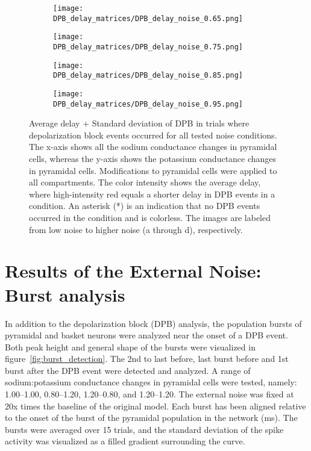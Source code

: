 \begin{figure}[htbp]
    \centering
    \begin{subfigure}{0.48\textwidth}
        \texttt{[image: DPB\_delay\_matrices/DPB\_delay\_noise\_0.65.png]}
        \caption{} %
    \end{subfigure}\hfill
    \begin{subfigure}{0.48\textwidth}
        \texttt{[image: DPB\_delay\_matrices/DPB\_delay\_noise\_0.75.png]}
        \caption{} %
    \end{subfigure}

    \bigskip %

    \begin{subfigure}{0.48\textwidth}
        \texttt{[image: DPB\_delay\_matrices/DPB\_delay\_noise\_0.85.png]}
        \caption{} %
    \end{subfigure}\hfill
    \begin{subfigure}{0.48\textwidth}
        \texttt{[image: DPB\_delay\_matrices/DPB\_delay\_noise\_0.95.png]}
        \caption{} %
    \end{subfigure}

    \caption[DPB delay matrices]{Average delay + Standard deviation of DPB in trials where depolarization block events occurred for all tested noise conditions.
    The x-axis shows all the sodium conductance changes in pyramidal cells, whereas the y-axis shows the potassium conductance changes in pyramidal cells.
    Modifications to pyramidal cells were applied to all compartments.
    The color intensity shows the average delay, where high-intensity red equals a shorter delay in DPB events in a condition.
    An asterisk (*) is an indication that no DPB events occurred in the condition and is colorless.
    The images are labeled from low noise to higher noise (a through d), respectively.}\label{fig:dpb_delay_matrices}
\end{figure}
\pagebreak

\section{Results of the External Noise: Burst analysis}
In addition to the depolarization block (DPB) analysis, the population bursts of pyramidal and basket neurons were analyzed near the onset of a DPB event.
Both peak height and general shape of the bursts were visualized in figure~\ref{fig:burst_detection}. 
The 2nd to last before, last burst before and 1st burst after the DPB event were detected and analyzed.
A range of sodium:potassium conductance changes in pyramidal cells were tested, namely: 1.00--1.00, 0.80--1.20, 1.20--0.80, and 1.20--1.20.
The external noise was fixed at 20x times the baseline of the original model.
Each burst has been aligned relative to the onset of the burst of the pyramidal population in the network (ms).
The bursts were averaged over 15 trials, and the standard deviation of the spike activity was visualized as a filled gradient surrounding the curve.

